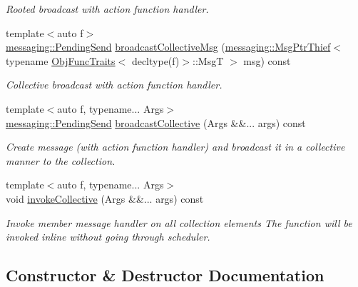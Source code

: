 \begin{DoxyCompactItemize}
\begin{DoxyCompactList}\small\item\em Rooted broadcast with action function handler. \end{DoxyCompactList}\item 
{\footnotesize template$<$auto f$>$ }\\\hyperlink{structvt_1_1messaging_1_1_pending_send}{messaging\+::\+Pending\+Send} \hyperlink{structvt_1_1vrt_1_1collection_1_1_broadcastable_adf84b47c6e8b7470e62fdba1ec5aaf3e}{broadcast\+Collective\+Msg} (\hyperlink{structvt_1_1messaging_1_1_msg_ptr_thief}{messaging\+::\+Msg\+Ptr\+Thief}$<$ typename \hyperlink{structvt_1_1_obj_func_traits}{Obj\+Func\+Traits}$<$ decltype(f)$>$\+::MsgT $>$ msg) const
\begin{DoxyCompactList}\small\item\em Collective broadcast with action function handler. \end{DoxyCompactList}\item 
{\footnotesize template$<$auto f, typename... Args$>$ }\\\hyperlink{structvt_1_1messaging_1_1_pending_send}{messaging\+::\+Pending\+Send} \hyperlink{structvt_1_1vrt_1_1collection_1_1_broadcastable_ab04bb88a6120f3032a9af4aa173dabb5}{broadcast\+Collective} (Args \&\&... args) const
\begin{DoxyCompactList}\small\item\em Create message (with action function handler) and broadcast it in a collective manner to the collection. \end{DoxyCompactList}\item 
{\footnotesize template$<$auto f, typename... Args$>$ }\\void \hyperlink{structvt_1_1vrt_1_1collection_1_1_broadcastable_a33918a1a36fb837635fa74c9610efeb8}{invoke\+Collective} (Args \&\&... args) const
\begin{DoxyCompactList}\small\item\em Invoke member message handler on all collection elements The function will be invoked inline without going through scheduler. \end{DoxyCompactList}\end{DoxyCompactItemize}


\subsection{Constructor \& Destructor Documentation}
\mbox{\label{structvt_1_1vrt_1_1collection_1_1_broadcastable_afc16bdb399c4a846fd741062d995a339}} 
